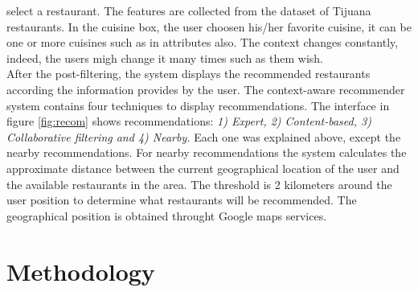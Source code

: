 select a restaurant. The features are collected from the dataset of
Tijuana restaurants. In the cuisine box, the user choosen his/her
favorite cuisine, it can be one or more cuisines such as in attributes 
also. 
The context changes constantly, indeed, the users migh change 
it many times such as them wish.\\ 
After the post-filtering, the system displays the  recommended
restaurants according the information provides by the user. The
context-aware recommender system contains four techniques to display
recommendations. The interface in figure \ref{fig:recom} shows
recommendations: \textit{1) Expert, 2) Content-based, 3) Collaborative
filtering and 4) Nearby.} Each one was explained above, except the
nearby recommendations. For nearby recommendations the system
calculates the approximate distance between the current geographical
location of the user and the available restaurants in the area.  The
threshold is 2 kilometers around the user position to determine what
restaurants will be recommended. The geographical position is
obtained throught Google maps services.


\section{Methodology} 

